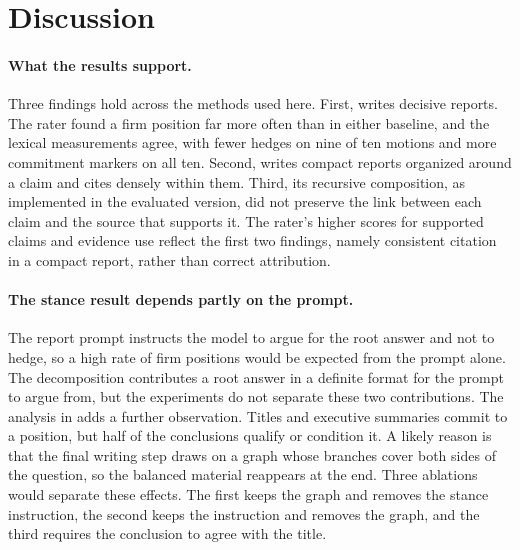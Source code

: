 \section{Discussion}
\label{sec:discussion}

\paragraph{What the results support.}
Three findings hold across the methods used here. First, \sys{} writes decisive reports. The rater found a firm position far more often than in either baseline, and the lexical measurements agree, with fewer hedges on nine of ten motions and more commitment markers on all ten. Second, \sys{} writes compact reports organized around a claim and cites densely within them. Third, its recursive composition, as implemented in the evaluated version, did not preserve the link between each claim and the source that supports it. The rater's higher scores for supported claims and evidence use reflect the first two findings, namely consistent citation in a compact report, rather than correct attribution.

\paragraph{The stance result depends partly on the prompt.}
The report prompt instructs the model to argue for the root answer and not to hedge, so a high rate of firm positions would be expected from the prompt alone. The decomposition contributes a root answer in a definite format for the prompt to argue from, but the experiments do not separate these two contributions. The analysis in  adds a further observation. Titles and executive summaries commit to a position, but half of the conclusions qualify or condition it. A likely reason is that the final writing step draws on a graph whose branches cover both sides of the question, so the balanced material reappears at the end. Three ablations would separate these effects. The first keeps the graph and removes the stance instruction, the second keeps the instruction and removes the graph, and the third requires the conclusion to agree with the title.

